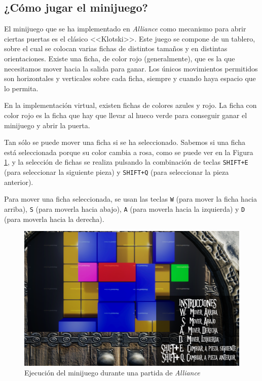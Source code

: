 \subsection{¿Cómo jugar el minijuego?}

El minijuego que se ha implementado en \textit{Alliance} como mecanismo para abrir ciertas puertas es el clásico <<Klotski>>. Este juego se compone de un tablero, sobre el cual se colocan varias fichas de distintos tamaños y en distintas orientaciones. Existe una ficha, de color rojo (generalmente), que es la que necesitamos mover hacia la salida para ganar. Los únicos movimientos permitidos son horizontales y verticales sobre cada ficha, siempre y cuando haya espacio que lo permita.

En la implementación virtual, existen fichas de colores azules y rojo. La ficha con color rojo es la ficha que hay que llevar al hueco verde para conseguir ganar el minijuego y abrir la puerta. 

Tan sólo se puede mover una ficha si se ha seleccionado. Sabemos si una ficha está seleccionada porque su color cambia a rosa, como se puede ver en la Figura \ref{Minijuego}, y la selección de fichas se realiza pulsando la combinación de teclas \texttt{SHIFT+E} (para seleccionar la siguiente pieza) y \texttt{SHIFT+Q} (para seleccionar la pieza anterior).

Para mover una ficha seleccionada, se usan las teclas \texttt{W} (para mover la ficha hacia arriba), \texttt{S} (para moverla hacia abajo), \texttt{A} (para moverla hacia la izquierda) y \texttt{D} (para moverla hacia la derecha).

\begin{figure}[H]
  \centering
  \includegraphics[width=12cm]{./images/Minijuego.png}
  \caption{Ejecución del minijuego durante una partida de \textit{Alliance}}
  \label{Minijuego}
\end{figure}

